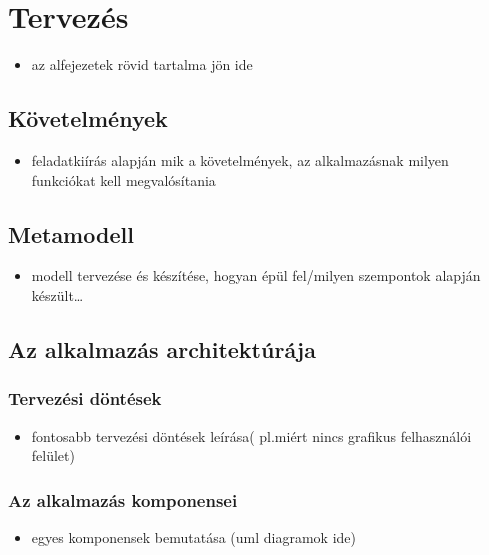 \chapter{Tervezés}
\begin{itemize}
  \item az alfejezetek rövid tartalma jön ide
\end{itemize}

\section{Követelmények}
\begin{itemize}
  \item feladatkiírás alapján mik a követelmények, az alkalmazásnak milyen funkciókat kell megvalósítania
\end{itemize}

\section{Metamodell}

\begin{itemize}
  \item modell tervezése és készítése, hogyan épül fel/milyen szempontok alapján készült\ldots
\end{itemize}

\section{Az alkalmazás architektúrája}

%
\subsection{Tervezési döntések}
%
\begin{itemize}
  \item fontosabb tervezési döntések leírása( pl.miért nincs grafikus felhasználói felület)
\end{itemize}

%
\subsection{Az alkalmazás komponensei}
%
\begin{itemize}
  \item egyes komponensek bemutatása (uml diagramok ide)
\end{itemize}